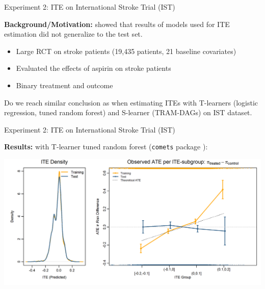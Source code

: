 \documentclass[onlytextwidth,english]{beamer}\usepackage[]{graphicx}\usepackage[]{xcolor}
\begin{document}
\begin{frame}{Experiment 2: ITE on International Stroke Trial (IST)}


\textbf{Background/Motivation:} \citet{chen2025} showed that results of models used for ITE estimation did not generalize to the test set.



\begin{itemize}
    \item Large RCT on stroke patients (19,435 patients, 21 baseline covariates)
    \item Evaluated the effects of aspirin on stroke patients
    \item Binary treatment and outcome
\end{itemize}



 Do we reach similar conclusion as \citet{chen2025} when estimating ITEs with T-learners (logistic regression, tuned random forest) and S-learner (TRAM-DAGs) on IST dataset.

\end{frame}



% 
% 
% 
% 
% 


\begin{frame}{Experiment 2: ITE on International Stroke Trial (IST)}

\textbf{Results:} with T-learner tuned random forest (\texttt{comets} package \citep{comets}):

\includegraphics[width=\textwidth]{img/Experiment2/IST_tuned_rf_tlearner_density_ITE_ATE.png}

\end{frame}
\end{document}
